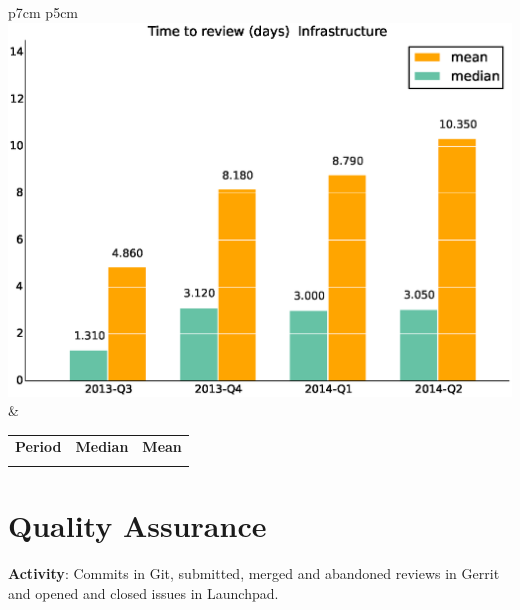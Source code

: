 \documentclass[a4wide,11pt]{report}
\begin{document}
\begin{tabular}{p{7cm} p{5cm}}
    \vspace{0pt} 
    \includegraphics[scale=.35]{figs/timetoreview_medianInfrastructure.eps}
    & 
    \vspace{0pt}
    \begin{tabular}{l|r|r|}%
    \bfseries Period & \bfseries Median & \bfseries Mean %
    \csvreader[head to column names]{data/timetoreview_medianInfrastructure.csv}{}%
    {\\ & \mediantime & \meantime}
    \end{tabular}
\end{tabular}


\newpage
\section{Quality Assurance}

\textbf{Activity}: Commits in Git, submitted, merged and abandoned reviews in Gerrit and opened and closed issues in Launchpad.
\end{document}
